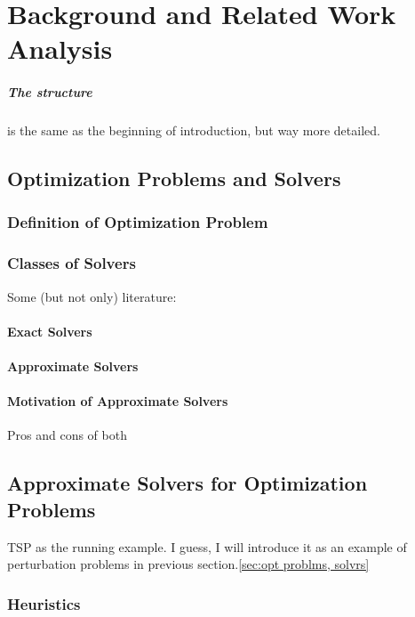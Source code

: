 \chapter{Background and Related Work Analysis}\label{bg}
\paragraph{The structure} is the same as the beginning of introduction, but way more detailed.  


\section{Optimization Problems and Solvers}\label{bg:opt problems and solvers}

\subsection{Definition of Optimization Problem}


\subsection{Classes of Solvers}
Some (but not only) literature: \cite{bergstra2011algorithms}
\subsubsection{Exact Solvers}
\subsubsection{Approximate Solvers}
\subsubsection{Motivation of Approximate Solvers}
Pros and cons of both \cite{hromkovivc2013algorithmics}


\section{Approximate Solvers for Optimization Problems}
TSP as the running example. I guess, I will introduce it as an example of perturbation problems in previous section.\ref{sec:opt problms, solvrs}

\subsection{Heuristics}
